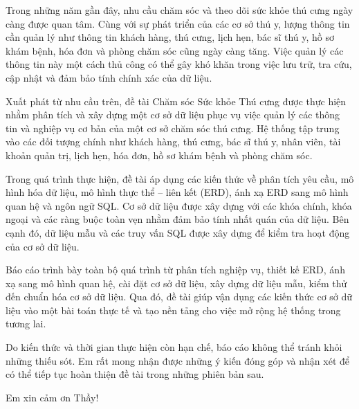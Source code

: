 Trong những năm gần đây, nhu cầu chăm sóc và theo dõi sức khỏe thú cưng ngày càng được quan tâm. Cùng với sự phát triển của các cơ sở thú y, lượng thông tin cần quản lý như thông tin khách hàng, thú cưng, lịch hẹn, bác sĩ thú y, hồ sơ khám bệnh, hóa đơn và phòng chăm sóc cũng ngày càng tăng. Việc quản lý các thông tin này một cách thủ công có thể gây khó khăn trong việc lưu trữ, tra cứu, cập nhật và đảm bảo tính chính xác của dữ liệu.

Xuất phát từ nhu cầu trên, đề tài  Chăm sóc Sức khỏe Thú cưng được thực hiện nhằm phân tích và xây dựng một cơ sở dữ liệu phục vụ việc quản lý các thông tin và nghiệp vụ cơ bản của một cơ sở chăm sóc thú cưng. Hệ thống tập trung vào các đối tượng chính như khách hàng, thú cưng, bác sĩ thú y, nhân viên, tài khoản quản trị, lịch hẹn, hóa đơn, hồ sơ khám bệnh và phòng chăm sóc.

Trong quá trình thực hiện, đề tài áp dụng các kiến thức về phân tích yêu cầu, mô hình hóa dữ liệu, mô hình thực thể -- liên kết (ERD), ánh xạ ERD sang mô hình quan hệ và ngôn ngữ SQL. Cơ sở dữ liệu được xây dựng với các khóa chính, khóa ngoại và các ràng buộc toàn vẹn nhằm đảm bảo tính nhất quán của dữ liệu. Bên cạnh đó, dữ liệu mẫu và các truy vấn SQL được xây dựng để kiểm tra hoạt động của cơ sở dữ liệu.

Báo cáo trình bày toàn bộ quá trình từ phân tích nghiệp vụ, thiết kế ERD, ánh xạ sang mô hình quan hệ, cài đặt cơ sở dữ liệu, xây dựng dữ liệu mẫu, kiểm thử đến chuẩn hóa cơ sở dữ liệu. Qua đó, đề tài giúp vận dụng các kiến thức cơ sở dữ liệu vào một bài toán thực tế và tạo nền tảng cho việc mở rộng hệ thống trong tương lai.

Do kiến thức và thời gian thực hiện còn hạn chế, báo cáo không thể tránh khỏi những thiếu sót. Em  rất mong nhận được những ý kiến đóng góp và nhận xét để có thể tiếp tục hoàn thiện đề tài trong những phiên bản sau.

Em xin cảm ơn Thầy!
